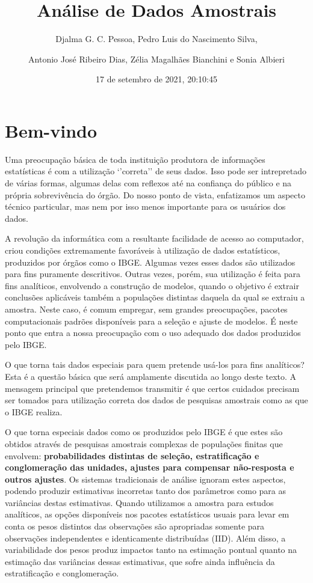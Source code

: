 \documentclass[
  12pt,
  brazilian,
]{book}
\title{Análise de Dados Amostrais}
\author{Djalma G. C. Pessoa, Pedro Luis do Nascimento Silva, \and Antonio José Ribeiro Dias, Zélia Magalhães Bianchini e Sonia Albieri}
\date{17 de setembro de 2021, 20:10:45}
\theoremstyle{definition}
\theoremstyle{definition}
\theoremstyle{definition}
\theoremstyle{definition}
\theoremstyle{remark}
\begin{document}
\maketitle

{
\setcounter{tocdepth}{1}
\tableofcontents
}
\hypertarget{bem-vindo}{%
\chapter*{Bem-vindo}\label{bem-vindo}}

Uma preocupação básica de toda instituição produtora de informações estatísticas é com a utilização `'correta'' de seus dados. Isso pode ser intrepretado de várias formas, algumas delas com reflexos até na confiança do público e na
própria sobrevivência do órgão. Do nosso ponto de vista, enfatizamos um aspecto
técnico particular, mas nem por isso menos importante para os usuários dos dados.

A revolução da informática com a resultante facilidade de acesso ao computador, criou condições extremamente favoráveis à utilização de dados estatísticos, produzidos por órgãos como o IBGE. Algumas vezes esses dados são utilizados para fins puramente descritivos. Outras vezes, porém, sua utilização é feita para fins analíticos, envolvendo a construção de modelos, quando o objetivo é extrair conclusões aplicáveis também a populações distintas daquela da qual se extraiu a amostra. Neste caso, é comum empregar, sem grandes preocupações, pacotes
computacionais padrões disponíveis para a seleção e ajuste de modelos. É neste ponto que entra a nossa preocupação com o uso adequado dos dados produzidos pelo IBGE.

O que torna tais dados especiais para quem pretende usá-los para fins
analíticos? Esta é a questão básica que será amplamente discutida ao longo deste texto. A mensagem principal que pretendemos transmitir é que certos cuidados precisam ser tomados para utilização correta dos dados de pesquisas amostrais como as que o IBGE realiza.

O que torna especiais dados como os produzidos pelo IBGE é que estes são obtidos através de pesquisas amostrais complexas de populações finitas que envolvem: \textbf{probabilidades distintas de seleção, estratificação e conglomeração das unidades, ajustes para compensar não-resposta e outros ajustes}. Os sistemas
tradicionais de análise ignoram estes aspectos, podendo produzir estimativas incorretas tanto dos parâmetros como para as variâncias destas estimativas. Quando utilizamos a amostra para estudos analíticos, as opções disponíveis nos pacotes estatísticos usuais para levar em conta os pesos distintos das observações são apropriadas somente para observações independentes e identicamente distribuídas (IID). Além disso, a variabilidade dos pesos produz
impactos tanto na estimação pontual quanto na estimação das variâncias dessas estimativas, que sofre ainda influência da estratificação e conglomeração.
\end{document}
